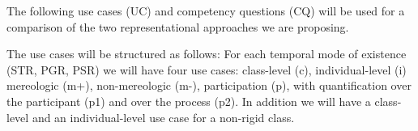 
The following use cases (UC) and competency questions (CQ) will be used for a comparison of the two representational approaches we are proposing. 

The use cases will be structured as follows: For each temporal mode of existence (STR, PGR, PSR) we will have four use cases: 
class-level (c), individual-level (i) mereologic (m+), non-mereologic (m-), participation (p), with quantification over the participant (p1) and over the process (p2). In addition we will have a class-level and an individual-level use case for a non-rigid class. 

